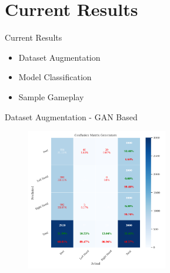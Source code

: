 \section{Current Results}
\begin{frame}{Current Results}
    \begin{itemize}
        \item Dataset Augmentation
        \item Model Classification
        \item Sample Gameplay
    \end{itemize}
\end{frame}

\begin{frame}{Dataset Augmentation - GAN Based}
    \begin{figure}[htpb!]
        \centering
        \includegraphics[width=0.55\textwidth]{figures/augmentation/gan/confusion_matrix_generators_saved_model_using_LSTMNet_0.5943600867678959.pkl.png}
    \end{figure}
\end{frame}

